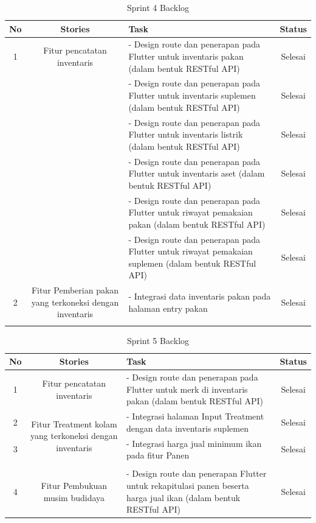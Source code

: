 \begin{spacing}{1.5}
\begin{table}[H]	
	\begin{center}
		\caption{Sprint 4 Backlog}
		\label{tab:table21}
		\begin{tabular}{|c|c|m{13em}|c|}
		\hline
		\textbf{No} & \textbf{Stories} & \textbf{Task} & \textbf{Status} \\
		\hline
		1 & \multirow{1}{12em}{Fitur pencatatan inventaris} & - Design route dan penerapan pada Flutter untuk inventaris pakan (dalam bentuk RESTful API) & Selesai \\
		\hline
		&  & - Design route dan penerapan pada Flutter untuk inventaris suplemen (dalam bentuk RESTful API) & Selesai  \\ 
		\hline
		&  & - Design route dan penerapan pada Flutter untuk inventaris listrik (dalam bentuk RESTful API) & Selesai  \\ 
		\hline
		&  & - Design route dan penerapan pada Flutter untuk inventaris aset (dalam bentuk RESTful API) & Selesai  \\ 
		\hline
		&  & - Design route dan penerapan pada Flutter untuk riwayat pemakaian pakan (dalam bentuk RESTful API) & Selesai  \\ 
		\hline
		&  & - Design route dan penerapan pada Flutter untuk riwayat pemakaian suplemen (dalam bentuk RESTful API) & Selesai  \\ 
		\hline
		2 & \multirow{1}{12em}{Fitur Pemberian pakan yang terkoneksi dengan inventaris} & - Integrasi data inventaris pakan pada halaman entry pakan  & Selesai \\
		&  &  &  \\ 
		\hline
		\end{tabular}
	\end{center}
\end{table}

\begin{table}[H]	
	\begin{center}
		\caption{Sprint 5 Backlog}
		\label{tab:table22}
		\begin{tabular}{|c|c|m{13em}|c|}
		\hline
		\textbf{No} & \textbf{Stories} & \textbf{Task} & \textbf{Status} \\
		\hline
		1 & \multirow{1}{12em}{Fitur pencatatan inventaris} &  - Design route dan penerapan pada Flutter untuk merk di inventaris pakan (dalam bentuk RESTful API) & Selesai \\
		\hline
		2 & \multirow{2}{12em}{Fitur Treatment kolam yang terkoneksi dengan inventaris} & - Integrasi halaman Input Treatment dengan data inventaris suplemen  & Selesai \\
		\hline
		3 & \multirow{2}{12em}{Fitur Panen termasuk harga nilai jual ikan} & - Integrasi harga jual minimum ikan pada fitur Panen  & Selesai \\
		& & & \\
		\hline
		4 & \multirow{1}{12em}{Fitur Pembukuan musim budidaya} & - Design route dan penerapan Flutter untuk rekapitulasi panen beserta harga jual ikan (dalam bentuk RESTful API)  & Selesai \\
		\hline
		\end{tabular}
	\end{center}
\end{table}


\end{spacing}
